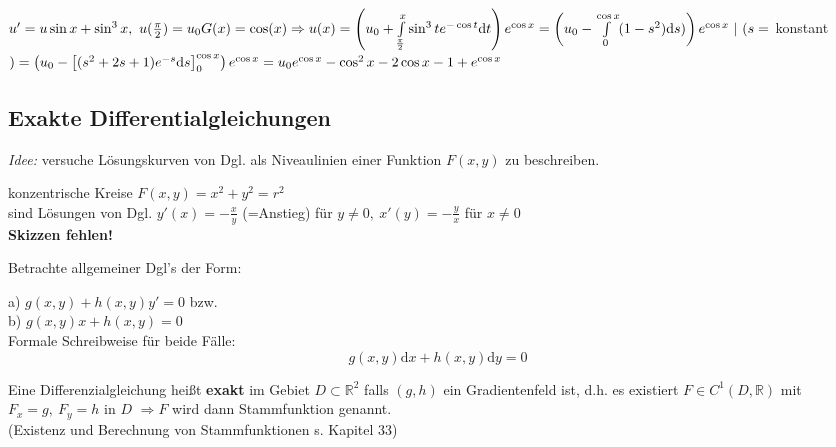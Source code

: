 \begin{beispiel*}
$u' = u \sin x + \sin^3 x, \ u(\frac{\pi}{2}) = u_0 \\
G(x) = \cos(x)
\Rightarrow u(x) = 
\left( u_0 +
\int\limits_{\frac{\pi}{2}}^x \sin^3 t e^{-\cos t} \mathrm{d}t 
\right)
e^{\cos x} \\
= \left( u_0 - \int\limits_0^{\cos x} (1-s^2) \mathrm{d}s )  \right) e^{\cos x}
\ | \ (s = $ konstant$) \\
= \left(u_0 - \left[(s^2 + 2s + 1) e^{-s} \mathrm{d}s \right]_0^{\cos x} \right)
e^{\cos x}
= u_0 e^{\cos x} - \cos^2 x - 2\cos x - 1 + e^{\cos x}
$

\end{beispiel*}

\subsection{Exakte Differentialgleichungen}

\emph{Idee:} versuche Lösungskurven von Dgl. als Niveaulinien einer Funktion 
$F(x,y) $ zu beschreiben.

\begin{beispiel*}
konzentrische Kreise $F(x,y)  = x^2 + y^2 = r^2 $ \\
sind Lösungen von Dgl. $y'(x) = - \frac{x}{y} $ (=Anstieg) für $ y \neq 0, \ 
x'(y)  = - \frac{y}{x} $ für $x \neq 0 $
\\
\textbf{Skizzen fehlen!}
\end{beispiel*}

Betrachte allgemeiner Dgl's der Form:

a) $g(x,y) + h(x,y) y' = 0 $ bzw. \\
b) $g(x,y)x + h(x,y) = 0 $ \\
Formale Schreibweise für beide Fälle:
\begin{equation}
    g(x,y) \mathrm{d}x + h(x,y) \mathrm{d}y = 0 
\end{equation}

\begin{definition}[exakt]
Eine Differenzialgleichung heißt \textbf{exakt} im Gebiet $D \subset \mathbb{R}^2 $ 
falls $(g,h) $ ein Gradientenfeld ist,
d.h. es existiert $F \in C^1(D,\mathbb{R}) $ mit \\
$F_x = g, \ F_y=h $ in $D$
$\Rightarrow F$ wird dann Stammfunktion genannt. \\
(Existenz und Berechnung von Stammfunktionen s. Kapitel 33)
\end{definition}

